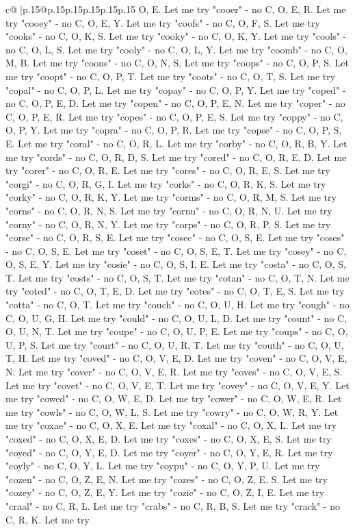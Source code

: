 \documentclass{article}
\begin{document}
{\begin{supertabular}{c@{$\;$}|p{.15\linewidth}@{}p{.15\linewidth}p{.15\linewidth}p{.15\linewidth}p{.15\linewidth}p{.15\linewidth}}
{{{O, E. Let me try "cooer" {-} no C, O, E, R. Let me try "cooey" {-} no C, O, E, Y. Let me try "coofs" {-} no C, O, F, S. Let me try "cooks" {-} no C, O, K, S. Let me try "cooky" {-} no C, O, K, Y. Let me try "cools" {-} no C, O, L, S. Let me try "cooly" {-} no C, O, L, Y. Let me try "coomb" {-} no C, O, M, B. Let me try "coons" {-} no C, O, N, S. Let me try "coops" {-} no C, O, P, S. Let me try "coopt" {-} no C, O, P, T. Let me try "coots" {-} no C, O, T, S. Let me try "copal" {-} no C, O, P, L. Let me try "copay" {-} no C, O, P, Y. Let me try "coped" {-} no C, O, P, E, D. Let me try "copen" {-} no C, O, P, E, N. Let me try "coper" {-} no C, O, P, E, R. Let me try "copes" {-} no C, O, P, E, S. Let me try "coppy" {-} no C, O, P, Y. Let me try "copra" {-} no C, O, P, R. Let me try "copse" {-} no C, O, P, S, E. Let me try "coral" {-} no C, O, R, L. Let me try "corby" {-} no C, O, R, B, Y. Let me try "cords" {-} no C, O, R, D, S. Let me try "cored" {-} no C, O, R, E, D. Let me try "corer" {-} no C, O, R, E. Let me try "cores" {-} no C, O, R, E, S. Let me try "corgi" {-} no C, O, R, G, I. Let me try "corks" {-} no C, O, R, K, S. Let me try "corky" {-} no C, O, R, K, Y. Let me try "corms" {-} no C, O, R, M, S. Let me try "corns" {-} no C, O, R, N, S. Let me try "cornu" {-} no C, O, R, N, U. Let me try "corny" {-} no C, O, R, N, Y. Let me try "corps" {-} no C, O, R, P, S. Let me try "corse" {-} no C, O, R, S, E. Let me try "cosec" {-} no C, O, S, E. Let me try "coses" {-} no C, O, S, E. Let me try "coset" {-} no C, O, S, E, T. Let me try "cosey" {-} no C, O, S, E, Y. Let me try "cosie" {-} no C, O, S, I, E. Let me try "costa" {-} no C, O, S, T. Let me try "costs" {-} no C, O, S, T. Let me try "cotan" {-} no C, O, T, N. Let me try "coted" {-} no C, O, T, E, D. Let me try "cotes" {-} no C, O, T, E, S. Let me try "cotta" {-} no C, O, T. Let me try "couch" {-} no C, O, U, H. Let me try "cough" {-} no C, O, U, G, H. Let me try "could" {-} no C, O, U, L, D. Let me try "count" {-} no C, O, U, N, T. Let me try "coupe" {-} no C, O, U, P, E. Let me try "coups" {-} no C, O, U, P, S. Let me try "court" {-} no C, O, U, R, T. Let me try "couth" {-} no C, O, U, T, H. Let me try "coved" {-} no C, O, V, E, D. Let me try "coven" {-} no C, O, V, E, N. Let me try "cover" {-} no C, O, V, E, R. Let me try "coves" {-} no C, O, V, E, S. Let me try "covet" {-} no C, O, V, E, T. Let me try "covey" {-} no C, O, V, E, Y. Let me try "cowed" {-} no C, O, W, E, D. Let me try "cower" {-} no C, O, W, E, R. Let me try "cowls" {-} no C, O, W, L, S. Let me try "cowry" {-} no C, O, W, R, Y. Let me try "coxae" {-} no C, O, X, E. Let me try "coxal" {-} no C, O, X, L. Let me try "coxed" {-} no C, O, X, E, D. Let me try "coxes" {-} no C, O, X, E, S. Let me try "coyed" {-} no C, O, Y, E, D. Let me try "coyer" {-} no C, O, Y, E, R. Let me try "coyly" {-} no C, O, Y, L. Let me try "coypu" {-} no C, O, Y, P, U. Let me try "cozen" {-} no C, O, Z, E, N. Let me try "cozes" {-} no C, O, Z, E, S. Let me try "cozey" {-} no C, O, Z, E, Y. Let me try "cozie" {-} no C, O, Z, I, E. Let me try "craal" {-} no C, R, L. Let me try "crabs" {-} no C, R, B, S. Let me try "crack" {-} no C, R, K. Let me try }}}
\end{supertabular}}
\end{document}
